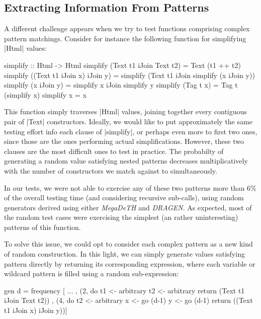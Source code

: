 %
\subsection{Extracting Information From Patterns}

A different challenge appears when we try to test functions comprising complex
pattern matchings. Consider for instance the following function for simplifying
|Html| values:

\begin{code}
simplify :: Html -> Html
simplify (Text t1 iJoin Text t2) = Text (t1 ++ t2)
simplify ((Text t1 iJoin x) iJoin y)
  = simplify (Text t1 iJoin simplify (x iJoin y))
simplify (x iJoin y) = simplify x iJoin simplify y
simplify (Tag t x) = Tag t (simplify x)
simplify x = x
\end{code}
%
This function simply traverses |Html| values, joining together every contiguous
pair of |Text| constructors.
%
Ideally, we would like to put approximately the same testing effort info each
clause of |simplify|, or perhaps even more to first two ones, since those are
the ones performing actual simplifications.
%
However, these two clauses are the most difficult ones to test in practice.
%
The probabilty of generating a random value satisfying nested patterns decreases
multiplicatively with the number of constructors we match against to
simultaneously.


In our tests, we were not able to exercise any of these two patterns more than
6\% of the overall testing time (and considering recursive sub-calls), using
random generators derived using either \emph{MegaDeTH} and \emph{DRAGEN}.
%
As expected, most of the random test cases were exercising the simplest (an
rather uninteresting) patterns of this function.


To solve this issue, we could opt to consider each complex pattern as a new kind
of random construction.
%
In this light, we can simply generate values satisfying pattern directly by
returning its corresponding expression, where each variable or wildcard pattern
is filled using a random sub-expression:

\begin{code}
  gen d = frequency
    [ ...
    , (2, do  t1  <- arbitrary
              t2  <- arbitrary
              return (Text t1 iJoin Text t2))
    , (4, do  t2  <- arbitrary
              x   <- go (d-1)
              y   <- go (d-1)
              return ((Text t1 iJoin x) iJoin y))]
\end{code}%



